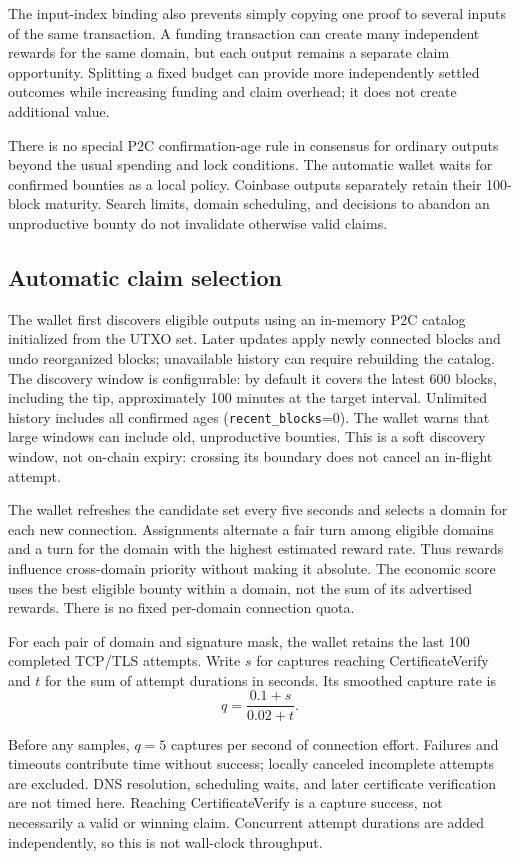 \documentclass[11pt,a4paper]{article}
\begin{document}
The input-index binding also prevents simply copying one proof to several
inputs of the same transaction. A funding transaction can create many
independent rewards for the same domain, but each output remains a separate
claim opportunity. Splitting a fixed budget can provide more independently
settled outcomes while increasing funding and claim overhead; it does not
create additional value.

There is no special P2C confirmation-age rule in consensus for ordinary
outputs beyond the usual spending and lock conditions. The automatic wallet
waits for confirmed bounties as a local policy. Coinbase outputs separately
retain their 100-block maturity. Search limits, domain scheduling, and
decisions to abandon an unproductive bounty do not invalidate otherwise
valid claims.

\subsection*{Automatic claim selection}

The wallet first discovers eligible outputs using an in-memory P2C catalog
initialized from the UTXO set. Later updates apply newly connected blocks and
undo reorganized blocks; unavailable history can require rebuilding the
catalog. The discovery window is configurable: by default it covers the latest
600 blocks, including the tip, approximately 100 minutes at the target interval.
Unlimited history includes all confirmed ages (\texttt{recent\_blocks}=0).
The wallet warns that large windows can include old, unproductive bounties.
This is a soft discovery window, not on-chain expiry: crossing its boundary
does not cancel an in-flight attempt.

The wallet refreshes the candidate set every five seconds and selects a domain
for each new connection. Assignments alternate a fair turn among eligible domains and a turn
for the domain with the highest estimated reward rate. Thus rewards influence
cross-domain priority without making it absolute. The economic score uses
the best eligible bounty within a domain, not the sum of its advertised rewards.
There is no fixed per-domain connection quota.

\begin{samepage}
For each pair of domain and signature mask, the wallet retains the last 100
completed TCP/TLS attempts. Write $s$ for captures reaching CertificateVerify
and $t$ for the sum of attempt durations in seconds. Its smoothed capture rate is
\begin{equation}
 q=\frac{0.1+s}{0.02+t}.
 \label{eq:rate}
\end{equation}
\par
\end{samepage}
Before any samples, $q=5$ captures per second of connection effort. Failures
and timeouts contribute time without success; locally canceled incomplete
attempts are excluded. DNS resolution, scheduling waits, and later certificate
verification are not timed here. Reaching CertificateVerify is a capture
success, not necessarily a valid or winning claim. Concurrent attempt
durations are added independently, so this is not wall-clock throughput.
\end{document}
